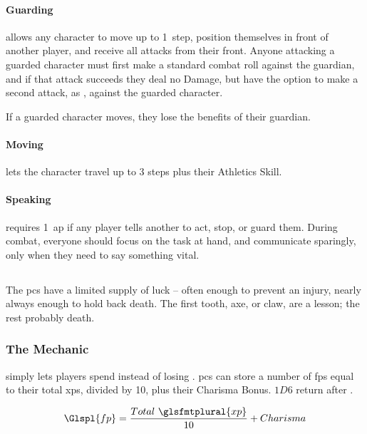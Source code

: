 \begin{multicols}{2}
\paragraph{Guarding}
\label{guarding}
allows any character to move up to 1~\gls{step}, position themselves in front of another player, and receive all attacks from their front.
Anyone attacking a guarded character must first make a standard combat roll against the guardian, and if that attack succeeds they deal no Damage, but have the option to make a second attack, as , against the guarded character.

If a guarded character moves, they lose the benefits of their guardian.

\paragraph{Moving}
\label{moving}
lets the character travel up to 3 steps plus their Athletics Skill.

\paragraph{Speaking}
requires 1~\gls{ap} if any player tells another to act, stop, or guard them.
During combat, everyone should focus on the task at hand, and communicate sparingly, only when they need to say something vital.

\subsection{}
\label{fate_points}

The \glspl{pc} have a limited supply of luck -- often enough to prevent an injury, nearly always enough to hold back death.
The first tooth, axe, or claw, are a lesson; the rest probably death.

\subsubsection{The Mechanic}
simply lets players spend  instead of losing .
\Glspl{pc} can store a number of \glspl{fp} equal to their total \glspl{xp}, divided by 10, plus their Charisma Bonus.
$1D6$ return after .%

\begin{center}
  $$\Glspl{fp} = \frac{Total~\glsfmtplural{xp}}{10} + Charisma$$
\end{center}


\end{multicols}
